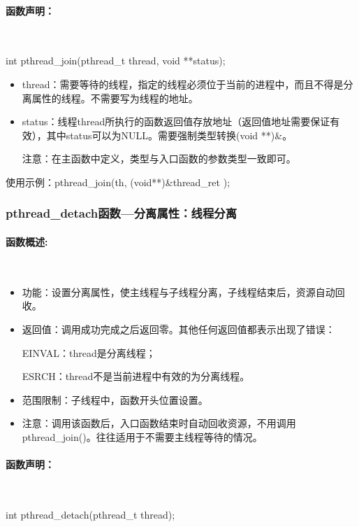 \documentclass[UTF8]{article}%
\begin{document}
\paragraph{函数声明：}~{}

int pthread\_join(pthread\_t thread, void **status);

\begin{itemize}
    \item thread：需要等待的线程，指定的线程必须位于当前的进程中，而且不得是分离属性的线程。不需要写为线程的地址。
    \item status：线程thread所执行的函数返回值存放地址（返回值地址需要保证有效），其中status可以为NULL。需要强制类型转换(void **)\&。
    
    注意：在主函数中定义，类型与入口函数的参数类型一致即可。

\end{itemize}

使用示例：pthread\_join(th, (void**)\&thread\_ret );  

\subsubsection{pthread\_detach函数---分离属性：线程分离}

\paragraph{函数概述:}~{}

\begin{itemize}
    \item 功能：设置分离属性，使主线程与子线程分离，子线程结束后，资源自动回收。
    \item 返回值：调用成功完成之后返回零。其他任何返回值都表示出现了错误：
    
    EINVAL：thread是分离线程；

    ESRCH：thread不是当前进程中有效的为分离线程。

    \item 范围限制：子线程中，函数开头位置设置。
    \item 注意：调用该函数后，入口函数结束时自动回收资源，不用调用pthread\_join()。往往适用于不需要主线程等待的情况。
\end{itemize}

\paragraph{函数声明：}~{}

int pthread\_detach(pthread\_t thread);
\end{document}
